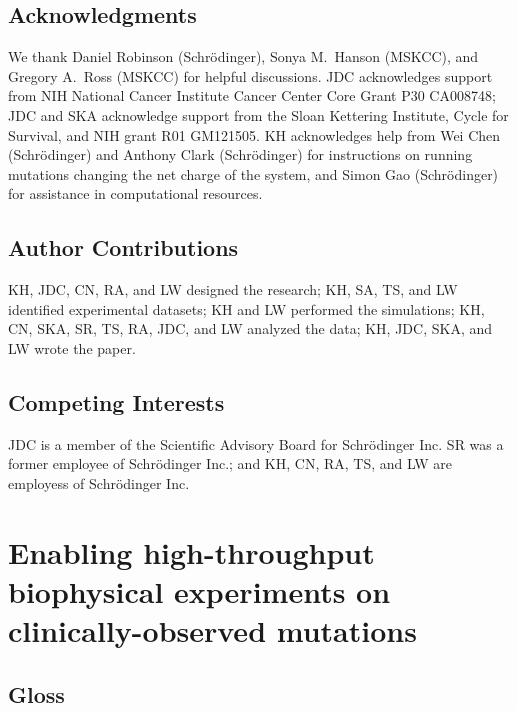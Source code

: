 \documentclass[phd,tocprelim]{cornell}
\begin{document}
\section{Acknowledgments}
We thank Daniel Robinson (Schr\"{o}dinger), Sonya M.\ Hanson (MSKCC), and Gregory A.\ Ross (MSKCC) for helpful discussions.
JDC acknowledges support from NIH National Cancer Institute Cancer Center Core Grant P30 CA008748; JDC and SKA acknowledge support from the Sloan Kettering Institute, Cycle for Survival, and NIH grant R01 GM121505.
KH acknowledges help from Wei Chen (Schr\"{o}dinger) and Anthony Clark (Schr\"{o}dinger) for instructions on running mutations changing the net charge of the system, and Simon Gao (Schr\"{o}dinger) for assistance in computational resources.

\section{Author Contributions}
KH, JDC, CN, RA, and LW designed the research; 
KH, SA, TS, and LW identified experimental datasets; 
KH and LW performed the simulations; 
KH, CN, SKA, SR, TS, RA, JDC, and LW analyzed the data; 
KH, JDC, SKA, and LW wrote the paper.

\section{Competing Interests}
JDC is a member of the Scientific Advisory Board for Schr\"{o}dinger Inc. SR was a former employee of Schr\"{o}dinger Inc.; and KH, CN, RA, TS, and LW are employess of Schr\"{o}dinger Inc.


\chapter{Enabling high-throughput biophysical experiments on clinically-observed mutations}

\section{Gloss}
\end{document}
